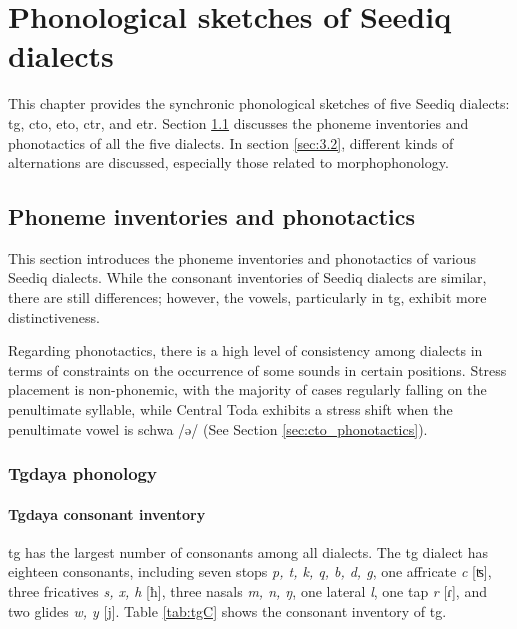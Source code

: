 \chapter{Phonological sketches of Seediq dialects}\label{ch3}

This chapter provides the synchronic phonological sketches of five Seediq dialects: \acl{tg}, \acl{cto}, \acl{eto}, \acl{ctr}, and \acl{etr}. Section \ref{sec:3.1} discusses the phoneme inventories and phonotactics of all the five dialects. In section \ref{sec:3.2}, different kinds of alternations are discussed, especially those related to morphophonology.

\section{Phoneme inventories and phonotactics} \label{sec:3.1}

This section introduces the phoneme inventories and phonotactics of various Seediq dialects. While the consonant inventories of Seediq dialects are similar, there are still differences; however, the vowels, particularly in \acl{tg}, exhibit more distinctiveness.

Regarding phonotactics, there is a high level of consistency among dialects in terms of constraints on the occurrence of some sounds in certain positions. Stress placement is non-phonemic, with the majority of cases regularly falling on the penultimate syllable, while Central Toda exhibits a stress shift when the penultimate vowel is schwa /ə/ (See Section \ref{sec:cto_phonotactics}).

\subsection{Tgdaya phonology}

\subsubsection{Tgdaya consonant inventory} \label{sec:tg_C}

\acl{tg} has the largest number of consonants among all dialects. The \acl{tg} dialect has eighteen consonants, including seven stops \textit{p, t, k, q, b, d, g}, one affricate \textit{c} [ʦ], three fricatives \textit{s, x, h} [ħ], three nasals \textit{m, n, ŋ}, one lateral \textit{l}, one tap \textit{r} [ɾ], and two glides \textit{w, y} [j]. Table \ref{tab:tgC} shows the consonant inventory of \acl{tg}.


